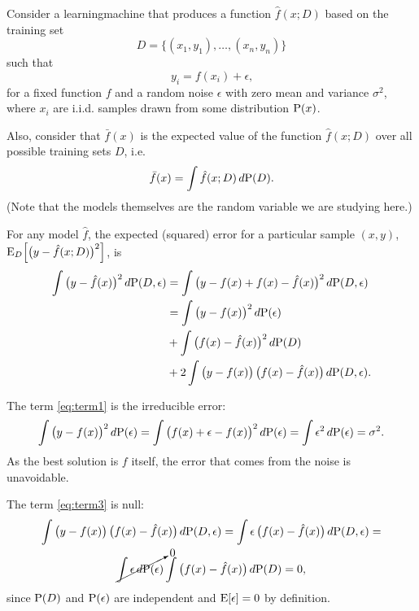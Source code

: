 Consider a \gls{learningmachine} that produces a function $\hat{f}(x; D)$ based on the
training set $$D = \big\{(x_1, y_1), \dots, (x_n, y_n)\big\}$$ such that
\[
  y_i = f(x_i) + \epsilon\text{,}
\]
for a fixed function $f$ and a random noise $\epsilon$ with zero mean and variance
$\sigma^2$, where $x_i$ are i.i.d. samples drawn from some distribution $\operatorname{P}(x)$.

Also, consider that $\bar{f}(x)$ is the expected value of the function $\hat{f}(x; D)$
over all possible training sets $D$, i.e.
\[
  \bar{f}(x) = \int \hat{f}(x; D)\, d\!\operatorname{P}(D)\text{.}
\]
(Note that the models themselves are the random variable we are studying here.)

For any model $\hat{f}$, the expected (squared) error for a particular sample $(x, y)$,
$\operatorname{E}_D\!\left[ \big( y - \hat{f}(x; D) \big)^2 \right]$, is
\begin{align}
  \notag \int \big( y - \hat{f}(x) \big)^2\, d\!\operatorname{P}(D, \epsilon)
    &= \int \big( y - f(x) + f(x) - \hat{f}(x) \big)^2\, d\!\operatorname{P}(D, \epsilon) \\
    &= \label{eq:term1}\int \big( y - f(x) \big)^2\, d\!\operatorname{P}(\epsilon) \\
    &+ \label{eq:term2}\int \big( f(x) - \hat{f}(x) \big)^2\, d\!\operatorname{P}(D) \\
    &+ \label{eq:term3}2 \int \big( y - f(x) \big)\,\big( f(x) - \hat{f}(x) \big)\, d\!\operatorname{P}(D, \epsilon)\text{.}
\end{align}

The term \eqref{eq:term1} is the irreducible error:
\begin{equation}
  \label{eq:irreducible-error}
  \int \big( y - f(x) \big)^2\, d\!\operatorname{P}(\epsilon) =
  \int \big( f(x) + \epsilon - f(x) \big)^2\, d\!\operatorname{P}(\epsilon) =
  \int \epsilon^2\, d\!\operatorname{P}(\epsilon) = \sigma^2\text{.}
\end{equation}
As the best solution is $f$ itself, the error that comes from the noise is unavoidable.

The term \eqref{eq:term3} is null:
\begin{multline*}
  \int \big( y - f(x) \big)\,\big( f(x) - \hat{f}(x) \big)\, d\!\operatorname{P}(D, \epsilon) =
  \int \epsilon\,\big( f(x) - \hat{f}(x) \big)\, d\!\operatorname{P}(D, \epsilon) = \\
  \cancelto{0}{\int \epsilon\, d\!\operatorname{P}(\epsilon)} \int \big( f(x) - \hat{f}(x) \big)\, d\!\operatorname{P}(D) = 0\text{,}
\end{multline*}
since $\operatorname{P}(D)$ and $\operatorname{P}(\epsilon)$ are independent and $\operatorname{E}[\epsilon] = 0$ by
definition.

